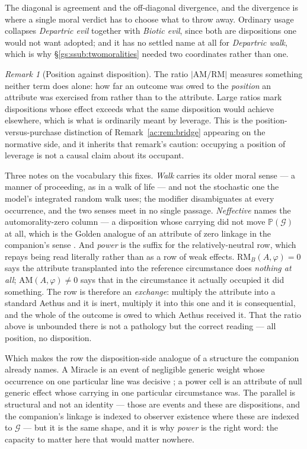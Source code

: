 \documentclass[11pt]{article}
\numberwithin{equation}{section}
\theoremstyle{plain}
\theoremstyle{definition}
\theoremstyle{remark}
\newtheorem{remark}[theorem]{Remark}
\newcommand{\PP}{\mathbb{P}}
\begin{document}
\noindent The diagonal is agreement and the off-diagonal divergence, and
the divergence is where a single moral verdict has to choose what to
throw away. Ordinary usage collapses \emph{Departric evil} together with
\emph{Biotic evil}, since both are dispositions one would not want
adopted; and it has no settled name at all for \emph{Departric walk},
which is why \S\ref{gs:ssub:twomoralities} needed two coordinates rather
than one.

\begin{remark}[Position against disposition]\label{gs:rem:power}
The ratio $|\mathrm{AM}/\mathrm{RM}|$ measures something neither term
does alone: how far an outcome was owed to the \emph{position} an
attribute was exercised from rather than to the attribute. Large ratios
mark dispositions whose effect exceeds what the same disposition would
achieve elsewhere, which is what is ordinarily meant by leverage. This is
the position-versus-purchase distinction of
Remark~\ref{ac:rem:bridge} appearing on the normative side, and it
inherits that remark's caution: occupying a position of leverage is not a
causal claim about its occupant.

Three notes on the vocabulary this fixes. \emph{Walk} carries its older
moral sense --- a manner of proceeding, as in a walk of life --- and not
the stochastic one the model's integrated random walk uses; the modifier
disambiguates at every occurrence, and the two senses meet in no single
passage. \emph{Neffective} names the
automorality-zero column --- a disposition whose carrying did not move
$\PP(\mathcal G)$ at all, which is the Golden analogue of an attribute of
zero linkage in the companion's sense \cite{Nexus}. And \emph{power} is
the suffix for the relatively-neutral row, which repays being read
literally rather than as a row of weak effects. $\mathrm{RM}_B(A,\varphi)
=0$ says the attribute transplanted into the reference circumstance does
\emph{nothing at all}; $\mathrm{AM}(A,\varphi)\neq0$ says that in the
circumstance it actually occupied it did something. The row is therefore
an \emph{exchange}: multiply the attribute into a standard Aethus and it
is inert, multiply it into this one and it is consequential, and the
whole of the outcome is owed to which Aethus received it. That the ratio
above is unbounded there is not a pathology but the correct reading ---
all position, no disposition.

Which makes the row the disposition-side analogue of a structure the
companion already names. A Miracle is an event of negligible generic
weight whose occurrence on one particular line was decisive
\cite{Nexus}; a power cell is an attribute of null generic effect whose
carrying in one particular circumstance was. The parallel is structural
and not an identity --- those are events and these are dispositions, and
the companion's linkage is indexed to observer existence where these are
indexed to $\mathcal G$ --- but it is the same shape, and it is why
\emph{power} is the right word: the capacity to matter here that would
matter nowhere.


\end{remark}
\end{document}

